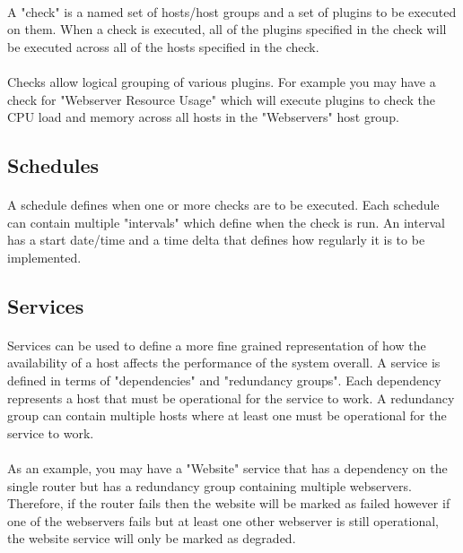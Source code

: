 \documentclass[bsc,logo,twoside]{infthesis}
\begin{document}
\paragraph*{}
	A "check" is a named set of hosts/host groups and a set of plugins to be
	executed on them.  When a check is executed, all of the plugins specified in
	the check will be executed across all of the hosts specified in the check.
	
\paragraph*{}
	Checks allow logical grouping of various plugins.  For example you may have a
	check for "Webserver Resource Usage" which will execute plugins to check the
	CPU load and memory across all hosts in the "Webservers" host group.

\subsection{Schedules}
\paragraph*{}
	A schedule defines when one or more checks are to be executed.  Each schedule
	can contain multiple "intervals" which define when the check is run.  An
	interval has a start date/time and a time delta that defines how regularly
	it is to be implemented.

\subsection{Services}
\paragraph*{}
	Services can be used to define a more fine grained representation of how the
	availability of a host affects the performance of the system overall.  A
	service is defined in terms of "dependencies" and "redundancy groups". Each
	dependency represents a host that must be operational for the service to
	work. A redundancy group can contain multiple hosts where at least one must
	be operational for the service to work.
	
\paragraph*{}
	As an example, you may have a "Website" service that has a dependency on
	the single router but has a redundancy group containing multiple webservers.
	Therefore, if the router fails then the website will be marked as failed
	however if one of the webservers fails but at least one other webserver is
	still operational, the website service will only be marked as degraded.
\end{document}
